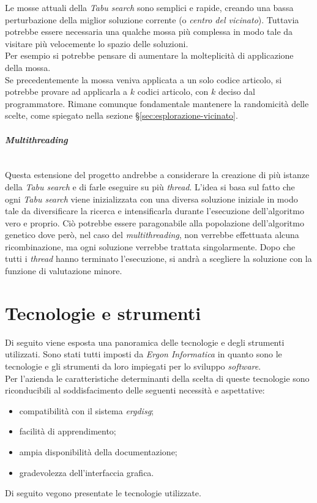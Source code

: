 Le mosse attuali della \textit{Tabu search} sono semplici e rapide,
creando una bassa perturbazione della miglior soluzione corrente
(o \textit{centro del vicinato}). Tuttavia potrebbe essere necessaria
una qualche mossa più complessa in modo tale da visitare
più velocemente lo spazio delle soluzioni.\\
Per esempio si potrebbe pensare di aumentare la molteplicità
di applicazione della mossa.\\
Se precedentemente
la mossa veniva applicata a un solo codice articolo, si potrebbe
provare ad applicarla a $k$ codici articolo, con $k$
deciso dal programmatore. Rimane comunque fondamentale mantenere
la randomicità delle scelte, come spiegato nella sezione §\ref{sec:esplorazione-vicinato}.
\vspace*{0.3cm}
\noindent \paragraph{\textit{Multithreading}}\hfill\\
Questa estensione del progetto andrebbe a considerare la
creazione di più istanze della \textit{Tabu search} e di farle eseguire su più \textit{thread}.
L'idea si basa sul fatto che ogni \textit{Tabu search} viene inizializzata
con una diversa soluzione iniziale in modo tale da diversificare
la ricerca e intensificarla durante l'esecuzione dell'algoritmo
vero e proprio. Ciò potrebbe essere paragonabile alla popolazione
dell'algoritmo genetico dove però, nel caso del \textit{multithreading}, non verrebbe effettuata alcuna
ricombinazione, ma ogni soluzione verrebbe trattata singolarmente.
Dopo che tutti i \textit{thread} hanno terminato l'esecuzione, si andrà
a scegliere la soluzione con la funzione di valutazione minore.

\newpage

\section{Tecnologie e strumenti}
\label{sec:tecnologie-strumenti}

\noindent Di seguito viene esposta una panoramica delle tecnologie e degli strumenti utilizzati.
Sono stati tutti imposti da \textit{Ergon Informatica} in quanto sono le tecnologie e gli strumenti
da loro impiegati per lo sviluppo \textit{software}.\\
Per l’azienda le caratteristiche determinanti della scelta di queste tecnologie
sono riconducibili al soddisfacimento delle seguenti necessità e aspettative:
\begin{itemize}
    \item compatibilità con il sistema \textit{\gls{ergdisg}};
    \item facilità di apprendimento;
    \item ampia disponibilità della documentazione;
    \item gradevolezza dell’interfaccia grafica.
\end{itemize}
Di seguito vegono presentate le tecnologie utilizzate.


